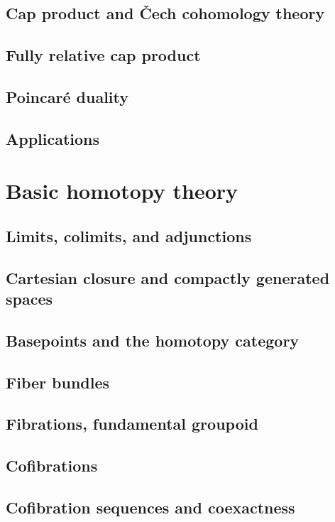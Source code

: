 \documentclass[oneside]{amsbook}
\numberwithin{ex}{section}
\begin{document}
\section{Cap product and Čech cohomology theory}

\setcounter{section}{35}
\section{Fully relative cap product}

\section{Poincaré duality}

\section{Applications}


\chapter{Basic homotopy theory}
\section{Limits, colimits, and adjunctions}

\section{Cartesian closure and compactly generated spaces}

\section{Basepoints and the homotopy category}

\section{Fiber bundles}

\section{Fibrations, fundamental groupoid}

\section{Cofibrations}

\section{Cofibration sequences and coexactness}

\end{document}

